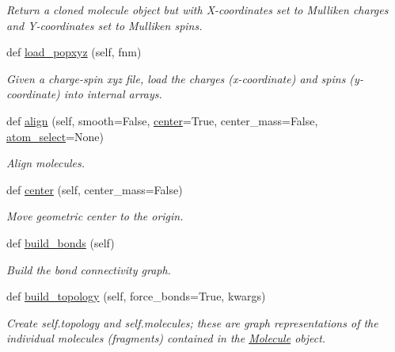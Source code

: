\begin{DoxyCompactItemize}
\begin{DoxyCompactList}\small\item\em Return a cloned molecule object but with X-\/coordinates set to Mulliken charges and Y-\/coordinates set to Mulliken spins. \end{DoxyCompactList}\item 
def \hyperlink{classsrc_1_1molecule_1_1Molecule_af2cf7dad143a2cca4cfa651c82185c3d}{load\+\_\+popxyz} (self, fnm)
\begin{DoxyCompactList}\small\item\em Given a charge-\/spin xyz file, load the charges (x-\/coordinate) and spins (y-\/coordinate) into internal arrays. \end{DoxyCompactList}\item 
def \hyperlink{classsrc_1_1molecule_1_1Molecule_ad74d00f84b4b0b66b18de8a3f6b41c88}{align} (self, smooth=False, \hyperlink{classsrc_1_1molecule_1_1Molecule_a3a4d580584a25a74ec835bf6b09ded81}{center}=True, center\+\_\+mass=False, \hyperlink{classsrc_1_1molecule_1_1Molecule_af7b405613971e5d76720b1a655e05981}{atom\+\_\+select}=None)
\begin{DoxyCompactList}\small\item\em Align molecules. \end{DoxyCompactList}\item 
def \hyperlink{classsrc_1_1molecule_1_1Molecule_a3a4d580584a25a74ec835bf6b09ded81}{center} (self, center\+\_\+mass=False)
\begin{DoxyCompactList}\small\item\em Move geometric center to the origin. \end{DoxyCompactList}\item 
def \hyperlink{classsrc_1_1molecule_1_1Molecule_a55418dce14e7b54da5ccfa96b0c564d4}{build\+\_\+bonds} (self)
\begin{DoxyCompactList}\small\item\em Build the bond connectivity graph. \end{DoxyCompactList}\item 
def \hyperlink{classsrc_1_1molecule_1_1Molecule_afae2c34b572e137801c8077f4267b247}{build\+\_\+topology} (self, force\+\_\+bonds=True, kwargs)
\begin{DoxyCompactList}\small\item\em Create self.\+topology and self.\+molecules; these are graph representations of the individual molecules (fragments) contained in the \hyperlink{classsrc_1_1molecule_1_1Molecule}{Molecule} object. \end{DoxyCompactList}\item 

\end{DoxyCompactItemize}
